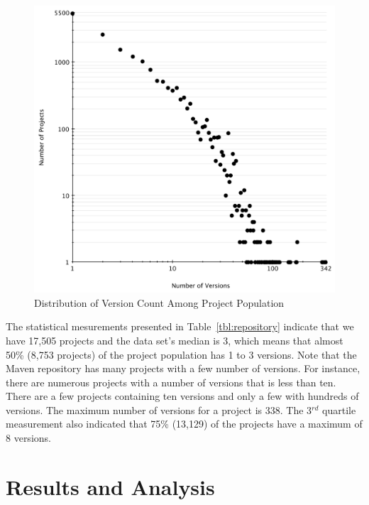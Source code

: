 \documentclass[conference]{IEEEtran}
\begin{document}
\begin{figure}
	\centering
	\includegraphics[scale=0.6]{version_count.pdf}
	\caption{Distribution of
Version Count Among Project Population}
	\label{fig:version-count}
\end{figure}

The statistical mesurements presented in Table~\ref{tbl:repository}
indicate that we have 17,505 projects and the data set's median
is 3, which means that almost 50\% (8,753 projects) of the project
population has 1 to 3 versions.
Note that the Maven repository has many projects with a
few number of versions. For instance, there are numerous projects with a
number of versions that is less than ten.
There are a few projects containing ten
versions and only a few with hundreds of versions. The maximum number of
versions for a project is 338. The 3$^{rd}$ quartile measurement
also indicated that 75\% (13,129) of the projects have a maximum of 8 versions.

\section{Results and Analysis}
\label{sec:res}
\end{document}
